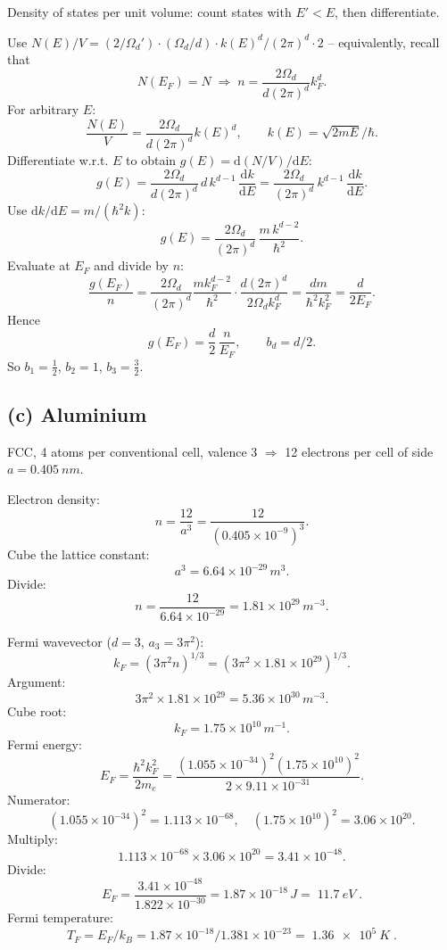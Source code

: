 \documentclass[11pt]{article}
\newcommand{\de}{\mathrm{d}}
\begin{document}
\medskip
Density of states per unit volume: count states with $E'<E$, then differentiate.

Use $N(E)/V = (2/\Omega_d')\cdot(\Omega_d/d)\cdot k(E)^d/(2\pi)^d\cdot 2$ -- equivalently, recall that
\[
N(E_F) = N \;\Rightarrow\; n = \frac{2\Omega_d}{d(2\pi)^d}k_F^d.
\]
For arbitrary $E$:
\[
\frac{N(E)}{V} = \frac{2\Omega_d}{d(2\pi)^d}k(E)^d,\qquad k(E)=\sqrt{2mE}/\hbar.
\]
Differentiate w.r.t. $E$ to obtain $g(E) = \de(N/V)/\de E$:
\[
g(E) = \frac{2\Omega_d}{d(2\pi)^d}\,d\,k^{d-1}\,\frac{\de k}{\de E} = \frac{2\Omega_d}{(2\pi)^d}\,k^{d-1}\,\frac{\de k}{\de E}.
\]
Use $\de k/\de E = m/(\hbar^2 k)$:
\[
g(E) = \frac{2\Omega_d}{(2\pi)^d}\,\frac{m\,k^{d-2}}{\hbar^2}.
\]
Evaluate at $E_F$ and divide by $n$:
\[
\frac{g(E_F)}{n} = \frac{2\Omega_d}{(2\pi)^d}\frac{m k_F^{d-2}}{\hbar^2}\cdot\frac{d(2\pi)^d}{2\Omega_d k_F^d} = \frac{d m}{\hbar^2 k_F^2} = \frac{d}{2 E_F}.
\]
Hence
\begin{equation}
\boxed{\;g(E_F) = \frac{d}{2}\,\frac{n}{E_F},\qquad b_d = d/2.\;}
\end{equation}
So $b_1 = \tfrac12$, $b_2 = 1$, $b_3 = \tfrac32$.

\subsection*{(c) Aluminium}

FCC, 4 atoms per conventional cell, valence 3 $\Rightarrow$ 12 electrons per cell of side $a=\SI{0.405}{nm}$.

Electron density:
\[
n = \frac{12}{a^3} = \frac{12}{(0.405\times 10^{-9})^3}.
\]
Cube the lattice constant:
\[
a^3 = 6.64\times 10^{-29}\,\si{m^3}.
\]
Divide:
\[
n = \frac{12}{6.64\times 10^{-29}} = 1.81\times 10^{29}\,\si{m^{-3}}.
\]

Fermi wavevector ($d=3$, $a_3=3\pi^2$):
\[
k_F = (3\pi^2 n)^{1/3} = (3\pi^2\times 1.81\times 10^{29})^{1/3}.
\]
Argument:
\[
3\pi^2\times 1.81\times 10^{29} = 5.36\times 10^{30}\,\si{m^{-3}}.
\]
Cube root:
\[
k_F = 1.75\times 10^{10}\,\si{m^{-1}}.
\]
Fermi energy:
\[
E_F = \frac{\hbar^2 k_F^2}{2m_e} = \frac{(1.055\times 10^{-34})^2(1.75\times 10^{10})^2}{2\times 9.11\times 10^{-31}}.
\]
Numerator:
\[
(1.055\times 10^{-34})^2 = 1.113\times 10^{-68},\quad (1.75\times 10^{10})^2 = 3.06\times 10^{20}.
\]
Multiply:
\[
1.113\times 10^{-68}\times 3.06\times 10^{20} = 3.41\times 10^{-48}.
\]
Divide:
\[
E_F = \frac{3.41\times 10^{-48}}{1.822\times 10^{-30}} = 1.87\times 10^{-18}\,\si{J} = \boxed{\;\SI{11.7}{eV}\;}.
\]
Fermi temperature:
\[
T_F = E_F/k_B = 1.87\times 10^{-18}/1.381\times 10^{-23} = \boxed{\;\SI{1.36e5}{K}\;}.
\]
\end{document}

